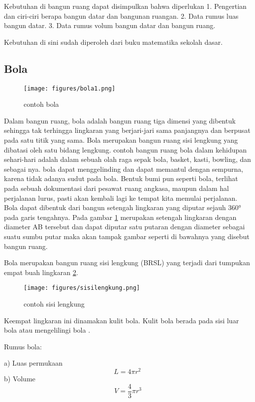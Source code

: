 Kebutuhan di bangun ruang dapat disimpulkan bahwa diperlukan 
1.    Pengertian dan ciri-ciri berapa bangun datar dan bangunan ruangan.
2.    Data rumus luas bangun datar.
3.    Data rumus volum bangun datar dan bangun ruang.

Kebutuhan di sini sudah diperoleh dari buku matematika sekolah dasar.

\subsection{Bola} 

\begin{figure}[ht]
    \centering
	\texttt{[image: figures/bola1.png]}
    \caption{contoh bola}
    \label{bola1}
\end{figure}

Dalam bangun ruang, bola adalah bangun ruang tiga dimensi yang dibentuk sehingga tak terhingga lingkaran yang berjari-jari sama panjangnya dan berpusat pada satu titik yang sama. Bola merupakan bangun ruang sisi lengkung yang dibatasi oleh satu bidang lengkung.
contoh bangun ruang bola dalam kehidupan sehari-hari adalah dalam sebuah olah raga sepak bola, basket, kasti, bowling, dan sebagai nya. bola dapat menggelinding dan dapat memantul dengan sempurna, karena tidak adanya sudut pada bola. 
Bentuk bumi pun seperti bola, terlihat pada sebuah dokumentasi dari pesawat ruang angkasa, maupun dalam hal perjalanan lurus, pasti akan kembali lagi ke tempat kita memulai perjalanan.
Bola dapat dibentuk dari bangun setengah lingkaran yang diputar sejauh 360° pada garis tengahnya. 
Pada gambar  \ref{bola1} merupakan setengah lingkaran dengan diameter AB  tersebut dan dapat diputar satu putaran dengan diameter sebagai suatu sumbu putar maka akan tampak gambar seperti di bawahnya yang disebut bangun ruang.


Bola merupakan bangun ruang sisi lengkung (BRSL) yang terjadi dari tumpukan empat buah lingkaran \ref{sisi lengkung}.
\begin{figure}[ht]
    \centering
\texttt{[image: figures/sisilengkung.png]}
    \caption{contoh sisi lengkung}
    \label{sisi lengkung}
    \end{figure} 
Keempat lingkaran ini dinamakan kulit bola. Kulit bola berada pada sisi luar bola atau mengelilingi bola \cite{nurfarikhin2010hubungan}.

Rumus bola:

a) Luas permukaan
 \begin{equation}
     L = 4 \pi r^2 \,
\end{equation}
b) Volume
\begin{equation}
     V = \frac{4}{3}\pi r^3
\end{equation}
